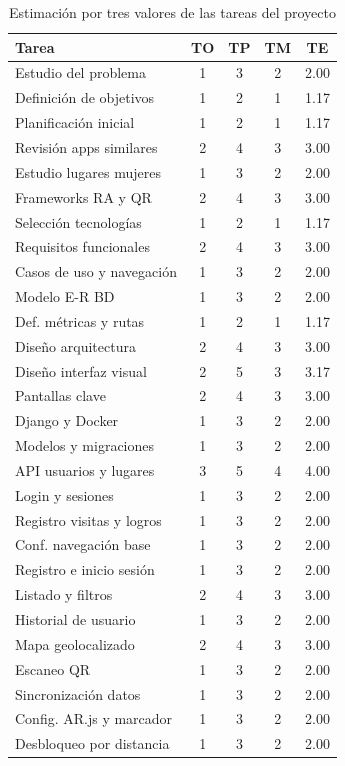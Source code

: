 \begin{table}[H]
\centering
\caption{Estimación por tres valores de las tareas del proyecto}
\begin{tabular}{|l|c|c|c|c|}
\hline
\textbf{Tarea} & \textbf{TO} & \textbf{TP} & \textbf{TM} & \textbf{TE} \\
\hline
Estudio del problema & 1 & 3 & 2 & 2.00 \\
Definición de objetivos & 1 & 2 & 1 & 1.17 \\
Planificación inicial & 1 & 2 & 1 & 1.17 \\
Revisión apps similares & 2 & 4 & 3 & 3.00 \\
Estudio lugares mujeres & 1 & 3 & 2 & 2.00 \\
Frameworks RA y QR & 2 & 4 & 3 & 3.00 \\
Selección tecnologías & 1 & 2 & 1 & 1.17 \\
Requisitos funcionales & 2 & 4 & 3 & 3.00 \\
Casos de uso y navegación & 1 & 3 & 2 & 2.00 \\
Modelo E-R BD & 1 & 3 & 2 & 2.00 \\
Def. métricas y rutas & 1 & 2 & 1 & 1.17 \\
Diseño arquitectura & 2 & 4 & 3 & 3.00 \\
Diseño interfaz visual & 2 & 5 & 3 & 3.17 \\
Pantallas clave & 2 & 4 & 3 & 3.00 \\
Django y Docker & 1 & 3 & 2 & 2.00 \\
Modelos y migraciones & 1 & 3 & 2 & 2.00 \\
API usuarios y lugares & 3 & 5 & 4 & 4.00 \\
Login y sesiones & 1 & 3 & 2 & 2.00 \\
Registro visitas y logros & 1 & 3 & 2 & 2.00 \\
Conf. navegación base & 1 & 3 & 2 & 2.00 \\
Registro e inicio sesión & 1 & 3 & 2 & 2.00 \\
Listado y filtros & 2 & 4 & 3 & 3.00 \\
Historial de usuario & 1 & 3 & 2 & 2.00 \\
Mapa geolocalizado & 2 & 4 & 3 & 3.00 \\
Escaneo QR & 1 & 3 & 2 & 2.00 \\
Sincronización datos & 1 & 3 & 2 & 2.00 \\
Config. AR.js y marcador & 1 & 3 & 2 & 2.00 \\
Desbloqueo por distancia & 1 & 3 & 2 & 2.00 \\

\end{tabular}
\end{table}
